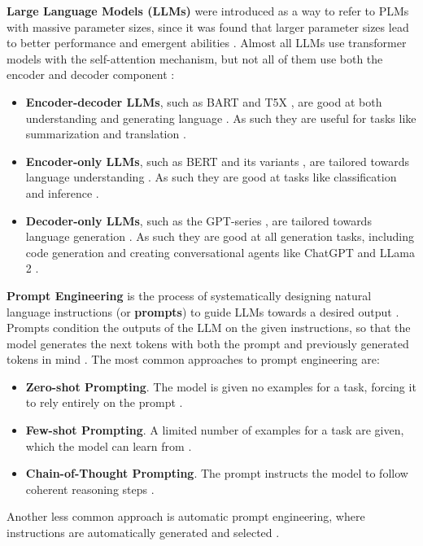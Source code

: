 \documentclass[a4paper]{article}
\begin{document}
\textbf{Large Language Models (LLMs)} were introduced as a way to refer to PLMs with massive parameter sizes, since it was found that larger parameter sizes lead to better performance and emergent abilities \cite{kaplan2020scaling,wei2022emergent}. Almost all LLMs use transformer models with the self-attention mechanism, but not all of them use both the encoder and decoder component \cite{hou2024}:
\begin{itemize}
    \item \textbf{Encoder-decoder LLMs}, such as BART \cite{lewis2019bart} and T5X \cite{roberts2022t5x}, are good at both understanding and generating language \cite{hou2024}. As such they are useful for tasks like summarization and translation \cite{cho2014encoderdecoder, Asadi2020encoderdecoder}.
    \item \textbf{Encoder-only LLMs}, such as BERT and its variants \cite{devlin2019bert,liu2019roberta,sanh2019distilbert,lan2020albert}, are tailored towards language understanding \cite{hou2024}. As such they are good at tasks like classification and inference \cite{koroteev2021encoder}. 
    \item \textbf{Decoder-only LLMs}, such as the GPT-series \cite{radford2018gpt,brown2020gpt3,openai2024gpt4}, are tailored towards language generation \cite{hou2024}. As such they are good at all generation tasks, including code generation \cite{poldrack2023} and creating conversational agents like ChatGPT \cite{OpenAI2023chatgpt} and LLama 2 \cite{touvron2023llama2}.
\end{itemize}




\textbf{Prompt Engineering} is the process of systematically designing natural language instructions (or \textbf{prompts}) to guide LLMs towards a desired output \cite{ronanki2023}. Prompts condition the outputs of the LLM on the given instructions, so that the model generates the next tokens with both the prompt and previously generated tokens in mind \cite{jurafsky2025}. The most common approaches to prompt engineering are:
\begin{itemize}
    \item \textbf{Zero-shot Prompting}. The model is given no examples for a task, forcing it to rely entirely on the prompt \cite{radford2019language}.
    \item \textbf{Few-shot Prompting}. A limited number of examples for a task are given, which the model can learn from \cite{brown2020fewshot}.
    \item \textbf{Chain-of-Thought Prompting}. The prompt instructs the model to follow coherent reasoning steps \cite{wei2022chain}.
\end{itemize}
Another less common approach is automatic prompt engineering, where instructions are automatically generated and selected \cite{zhou2023ape}.
\end{document}
